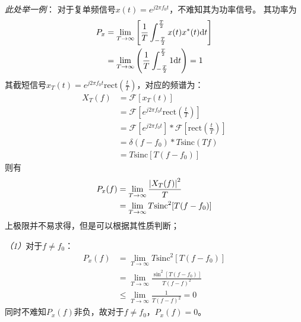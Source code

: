     \emph{此处举一例}：
    对于复单频信号$x(t)=e^{j2\pi f_0t}$，不难知其为功率信号。
    其功率为
    \begin{equation}
        \begin{split}
            P_x &=\lim_{T\to\infty}\left[\frac{1}{T}\int_{-\frac{T}{2}}^{\frac{T}{2}}x(t)x^*(t)\text{\upshape d} t\right]\\
                &=\lim_{T\to\infty}\left(\frac{1}{T}\int_{-\frac{T}{2}}^{\frac{T}{2}}1\text{\upshape d} t\right)=1
        \end{split}
    \end{equation}
    其截短信号$x_T(t)=e^{j2\pi f_0t}\text{rect}(\frac{t}{T})$，对应的频谱为：
    \begin{equation}
        \begin{split}
            X_T(f)  &=\mathscr{F}[x_T(t)]\\
                    &=\mathscr{F}[e^{j2\pi f_0t}\text{rect}(\frac{t}{T})]\\
                    &=\mathscr{F}[e^{j2\pi f_0t}]*\mathscr{F}[\text{rect}(\frac{t}{T})]\\
                    &=\delta (f-f_0)*T\text{sinc}(Tf)\\
                    &=T\text{sinc}[T(f-f_0)]
        \end{split}
    \end{equation}
    则有
    \begin{equation}
        \begin{split}
            P_x(f)  &=\lim_{T\to\infty}\frac{\left\vert X_T(f) \right\vert^2}{T}\\
                    &=\lim_{T\to\infty}T\text{sinc}^2[T(f-f_0)]
        \end{split}
    \end{equation}
    上极限并不易求得，但是可以根据其性质判断；

    \emph{（1）}对于$f\neq f_0$：
    \begin{equation*}
        \begin{split}
        P_x(f)  &=\lim_{T\to\infty}T\text{sinc}^2[T(f-f_0)]\\
                &=\lim_{T\to\infty}\frac{\sin^2[T(f-f_0)]}{T(f-f)^2}\\
                &\leq\lim_{T\to\infty}\frac{1}{T(f-f)^2}=0
        \end{split}
    \end{equation*}
    同时不难知$P_x(f)$非负，故对于$f\neq f_0$，$P_x(f)=0$。

